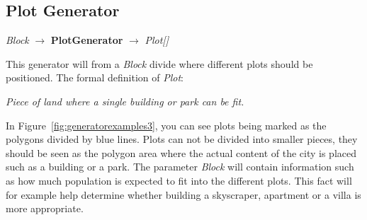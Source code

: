 \subsection{Plot Generator}
\begin{center}
    \textit{Block} $\rightarrow$ \textbf{PlotGenerator} $\rightarrow$ \textit{Plot{[}{]}}
\end{center}
This generator will from a \textit{Block} divide where different plots should be positioned. 
The formal definition of \textit{Plot}:
\begin{center}
    \textit{Piece of land where a single building or park can be fit.}
\end{center}
In Figure~\ref{fig:generatorexamples3}, you can see plots being marked as the polygons divided by blue lines. 
Plots can not be divided into smaller pieces, they should be seen as the polygon area where the actual content of the city is placed such as a building or a park.
The parameter \textit{Block} will contain information such as how much population is expected to fit into the different plots. 
This fact will for example help determine whether building a skyscraper, apartment or a villa is more appropriate.